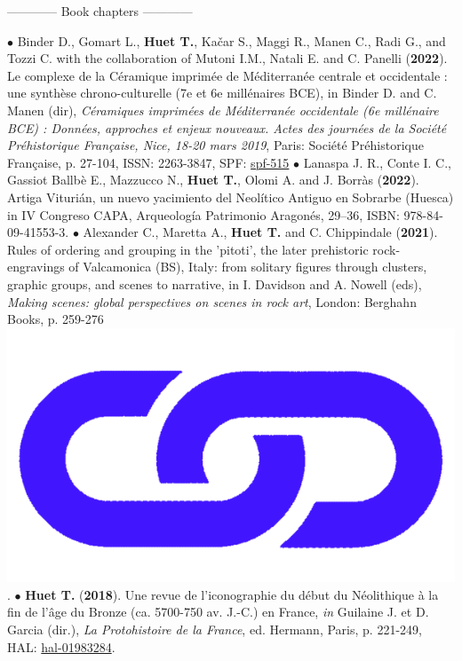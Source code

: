 \documentclass{article}
\begin{document}
\bigbreak
\begin{center}------------ Book chapters ------------\end{center}
\smallbreak
$\bullet$ Binder D., Gomart L., \textbf{Huet T.}, Ka{\v{c}}ar S., Maggi R., Manen C., Radi G., and Tozzi C. with the collaboration of Mutoni I.M., Natali E. and C. Panelli (\textbf{2022}). Le complexe de la C\'{e}ramique imprim\'{e}e de M\'{e}diterran\'{e}e centrale et occidentale : une synthèse chrono-culturelle (7e et 6e millénaires BCE), in Binder D. and C. Manen (dir), \textit{C\'{e}ramiques imprim\'{e}es de M\'{e}diterran\'{e}e occidentale (6e mill\'{e}naire BCE) : Donn\'{e}es, approches et enjeux nouveaux. Actes des journ\'{e}es de la Soci\'{e}t\'{e} Pr\'{e}historique Fran\c{c}aise, Nice, 18-20 mars 2019}, Paris: Soci\'{e}t\'{e} Pr\'{e}historique Fran\c{c}aise, p. 27-104, ISSN: 2263-3847, SPF: \href{https://www.prehistoire.org/515_p_57657/accEs-libre-seance-18-ceramiques-imprimees-de-mediterranee-occidentale.html}{spf-515}
\smallbreak
$\bullet$ Lanaspa J. R., Conte I. C., Gassiot Ballbè E., Mazzucco N., \textbf{Huet T.}, Olomi A. and J. Borràs (\textbf{2022}). Artiga Viturián, un nuevo yacimiento del Neolítico Antiguo en Sobrarbe (Huesca) in IV Congreso CAPA, Arqueología Patrimonio Aragonés, 29–36, ISBN: 978-84-09-41553-3.
\smallbreak
$\bullet$ Alexander C., Maretta A., \textbf{Huet T.} and C. Chippindale (\textbf{2021}). Rules of ordering and grouping in the 'pitoti', the later prehistoric rock-engravings of Valcamonica (BS), Italy: from solitary figures through clusters, graphic groups, and scenes to narrative, in I. Davidson and A. Nowell (eds), \textit{Making scenes: global perspectives on scenes in rock art}, London: Berghahn Books, p. 259-276 \href{https://www.berghahnbooks.com/title/DavidsonMaking}{\includegraphics[scale=0.02]{link_darkblue.png}}.
\smallbreak
$\bullet$ \textbf{Huet T.} (\textbf{2018}). Une revue de l'iconographie du d\'{e}but du N\'{e}olithique \`{a} la fin de l'\^{a}ge du Bronze (ca. 5700-750 av. J.-C.) en France, \textit{in} Guilaine J. et D. Garcia (dir.), \textit{La Protohistoire de la France}, ed. Hermann, Paris, p. 221-249, HAL: \href{https://hal.archives-ouvertes.fr/hal-01983284}{hal-01983284}.
\bigbreak
\end{document}
